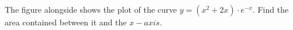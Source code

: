 
%
%
%
%
% 
% 

\question The figure alongside shows the plot of the curve $y=(x^2+2x)\cdot e^{-x}$.
Find the area contained between it and the $x-axis$.

\insertQR{}

\ifprintanswers
\fi 

